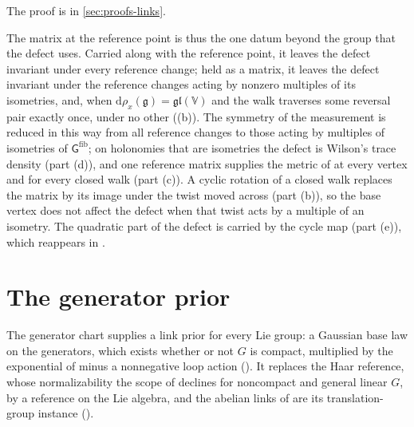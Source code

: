 The proof is in \cref{sec:proofs-links}.

The matrix at the reference point is thus the one datum beyond the group that the defect uses. Carried
along with the reference point, it leaves the defect invariant under every reference change; held as a
matrix, it leaves the defect invariant under the reference changes acting by nonzero multiples of its
isometries, and, when $\mathrm d\rho_x(\mathfrak g)=\mathfrak{gl}(\mathbb V)$ and the walk traverses some
reversal pair exactly once, under no other ((b)). The symmetry of the measurement is reduced in this way from all
reference changes to those acting by multiples of isometries of $\mathsf G^{\mathrm{fib}}$; on
holonomies that are isometries the defect is Wilson's trace density (part (d)), and one reference matrix
supplies the metric of  at every vertex and for every closed walk (part
(c)). A cyclic rotation of a closed walk replaces the matrix by its image under the twist moved across
(part (b)), so the base vertex does not affect the defect when that twist acts by a multiple of an
isometry. The quadratic part of the defect is carried by the cycle map (part (e)), which reappears in
.

\section{The generator prior}
\label{sec:link-prior}

The generator chart supplies a link prior for every Lie group: a Gaussian base law on the generators,
which exists whether or not $G$ is compact, multiplied by the exponential of minus a nonnegative loop
action (). It replaces the Haar reference, whose normalizability the scope
of  declines for noncompact and general linear $G$, by a reference on the Lie algebra,
and the abelian links of  are its translation-group instance
().

